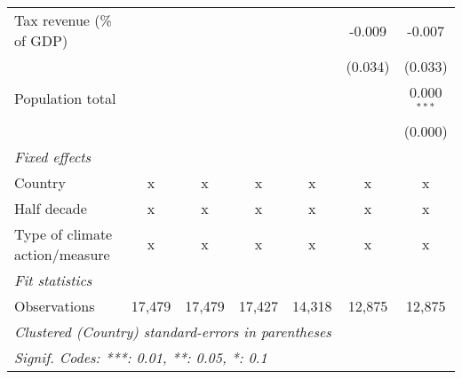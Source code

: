 \begin{tabular}{lcccccc}
   Tax revenue (\% of GDP)                             &         &         &             &               & -0.009         & -0.007\\   
                                                       &         &         &             &               & (0.034)        & (0.033)\\   
   Population total                                    &         &         &             &               &                & 0.000$^{***}$\\   
                                                       &         &         &             &               &                & (0.000)\\   
   \emph{Fixed effects}\\
   Country                                             & x       & x       & x           & x             & x              & x\\  
   Half decade                                         & x       & x       & x           & x             & x              & x\\  
   Type of climate action/measure                      & x       & x       & x           & x             & x              & x\\  
   \midrule \emph{Fit statistics}\\
   Observations                                        & 17,479  & 17,479  & 17,427      & 14,318        & 12,875         & 12,875\\  
   \midrule
   \multicolumn{7}{l}{\emph{Clustered (Country) standard-errors in parentheses}}\\
   \multicolumn{7}{l}{\emph{Signif. Codes: ***: 0.01, **: 0.05, *: 0.1}}\\
\end{tabular}
\par\endgroup


